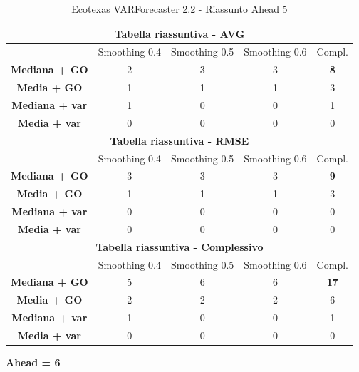 \documentclass[12pt,a4paper,oneside,openright]{book}
\begin{document}
\begin{table}[H]
\centering
\begin{tabular}{|c|c|c|c|c|}
\hline
\multicolumn{5}{|c|}{\textbf{Tabella riassuntiva - AVG}} \\
\hline
& Smoothing 0.4 & Smoothing 0.5 & Smoothing 0.6 & Compl.\\
\hline
\textbf{Mediana + GO} & 2 & 3 & 3 & \textbf{8}\\ 
\hline
\textbf{Media + GO} & 1 & 1 & 1 & 3\\ 
\hline
\textbf{Mediana + var} & 1 & 0 & 0 & 1\\ 
\hline
\textbf{Media + var} & 0 & 0 & 0 & 0\\ 
\hline
\multicolumn{5}{|c|}{\textbf{Tabella riassuntiva - RMSE}} \\
\hline
& Smoothing 0.4 & Smoothing 0.5 & Smoothing 0.6 & Compl.\\
\hline
\textbf{Mediana + GO} & 3 & 3 & 3 & \textbf{9}\\ 
\hline
\textbf{Media + GO} & 1 & 1 & 1 & 3\\ 
\hline
\textbf{Mediana + var} & 0 & 0 & 0 & 0\\ 
\hline
\textbf{Media + var} & 0 & 0 & 0 & 0\\ 
\hline
\multicolumn{5}{|c|}{\textbf{Tabella riassuntiva - Complessivo}} \\
\hline
& Smoothing 0.4 & Smoothing 0.5 & Smoothing 0.6 & Compl.\\
\hline
\textbf{Mediana + GO} & 5 & 6 & 6 & \textbf{17}\\ 
\hline
\textbf{Media + GO} & 2 & 2 & 2 & 6\\ 
\hline
\textbf{Mediana + var} & 1 & 0 & 0 & 1\\ 
\hline
\textbf{Media + var} & 0 & 0 & 0 & 0\\ 
\hline
\end{tabular}
\caption{Ecotexas VARForecaster 2.2 - Riassunto Ahead 5}
\end{table} 

\newpage

\textbf{Ahead = 6}
\end{document}
